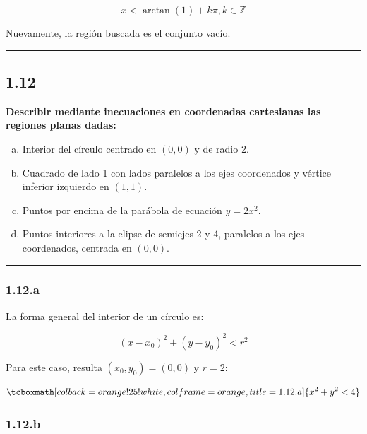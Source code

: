 \documentclass{article}
\renewcommand{\Bbb}{\mathbb}
\begin{document}
\begin{equation}
x < \arctan(1) + k \pi, k \in \Bbb Z
\end{equation}

Nuevamente, la región buscada es el conjunto vacío.

\hrule
\vspace{10 pt}

\subsection*{1.12}
\label{subsec:1.12}

\textbf{Describir mediante inecuaciones en coordenadas cartesianas las regiones planas dadas:}

\begin{enumerate}[(a)]
\bfseries
\item Interior del círculo centrado en $(0, 0)$ y de radio 2.

\item Cuadrado de lado 1 con lados paralelos a los ejes coordenados y vértice inferior izquierdo en $(1, 1)$.

\item Puntos por encima de la parábola de ecuación $y = 2x^2$.

\item Puntos interiores a la elipse de semiejes 2 y 4, paralelos a los ejes coordenados, centrada en $(0, 0)$.

\end{enumerate}
\hrule

\subsubsection*{1.12.a}
\label{subsubsec:1.12.a}

La forma general del interior de un círculo es:

\begin{equation}
(x-x_0)^2 + (y-y_0)^2 < r^2
\end{equation}

Para este caso, resulta $(x_0, y_0) = (0, 0)$ y $r=2$:

\begin{equation}
\tcboxmath[colback=orange!25!white,colframe=orange,title=1.12.a]
{ x^2 + y^2 < 4 }
\end{equation}

\subsubsection*{1.12.b}
\label{subsubsec:1.12.b}
\end{document}
